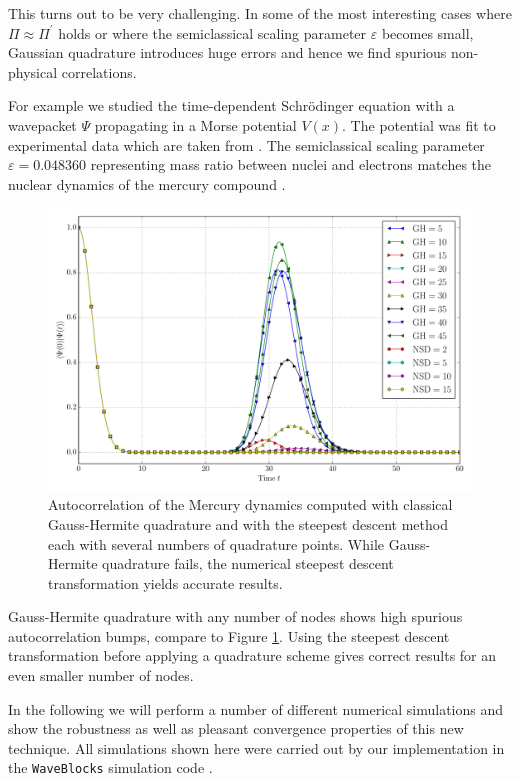 \documentclass[a4paper,10pt]{article}
\begin{document}
This turns out to be very challenging. In some of the most interesting cases where
$\Pi \approx \Pi^{\prime}$ holds or where the semiclassical scaling parameter $\varepsilon$
becomes small, Gaussian quadrature introduces huge errors and hence we find spurious
non-physical correlations.

For example we studied the time-dependent Schr\"odinger equation with a wave\-packet $\Psi$
propagating in a Morse potential $V(x)$. The potential was fit to experimental data which
are taken from \cite{SIZ_hg2}. The semiclassical scaling parameter $\varepsilon = 0.048360$
representing mass ratio between nuclei and electrons matches the nuclear dynamics of the
mercury compound .

\begin{figure}
  \centering
  \includegraphics[width=0.8\linewidth]{./fig/ac_mercurial_morse.pdf}
  \caption{Autocorrelation of the Mercury dynamics computed with classical
  Gauss-Hermite quadrature and with the steepest descent method each with several
  numbers of quadrature points. While Gauss-Hermite quadrature fails,
  the numerical steepest descent transformation yields accurate results.}
  \label{fig:ac_mercurial_morse}
\end{figure}

Gauss-Hermite quadrature with any number of nodes shows high spurious autocorrelation bumps,
compare to Figure \ref{fig:ac_mercurial_morse}. Using the steepest descent transformation
before applying a quadrature scheme gives correct results for an even smaller number of nodes.

In the following we will perform a number of different numerical simulations and show
the robustness as well as pleasant convergence properties of this new technique.
All simulations shown here were carried out by our implementation in the \texttt{WaveBlocks}
simulation code \cite{waveblocksnd}.
\end{document}
